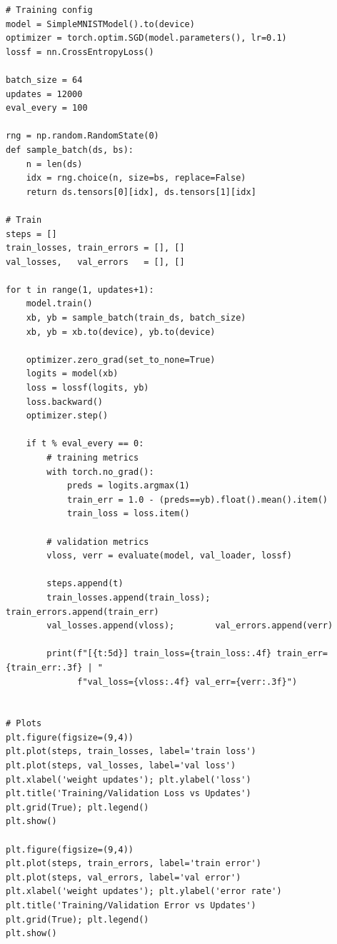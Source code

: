 \documentclass[11pt, reqno, letterpaper, twoside]{amsart}
\theoremstyle{plain}
\theoremstyle{definition}
\begin{document}
\begin{lstlisting}
# Training config
model = SimpleMNISTModel().to(device)
optimizer = torch.optim.SGD(model.parameters(), lr=0.1)
lossf = nn.CrossEntropyLoss()

batch_size = 64
updates = 12000             
eval_every = 100          

rng = np.random.RandomState(0)
def sample_batch(ds, bs):
    n = len(ds)
    idx = rng.choice(n, size=bs, replace=False)
    return ds.tensors[0][idx], ds.tensors[1][idx]

# Train
steps = []
train_losses, train_errors = [], []
val_losses,   val_errors   = [], []

for t in range(1, updates+1):
    model.train()
    xb, yb = sample_batch(train_ds, batch_size)
    xb, yb = xb.to(device), yb.to(device)

    optimizer.zero_grad(set_to_none=True)
    logits = model(xb)
    loss = lossf(logits, yb)
    loss.backward()
    optimizer.step()

    if t % eval_every == 0:
        # training metrics
        with torch.no_grad():
            preds = logits.argmax(1)
            train_err = 1.0 - (preds==yb).float().mean().item()
            train_loss = loss.item()

        # validation metrics
        vloss, verr = evaluate(model, val_loader, lossf)

        steps.append(t)
        train_losses.append(train_loss); train_errors.append(train_err)
        val_losses.append(vloss);        val_errors.append(verr)

        print(f"[{t:5d}] train_loss={train_loss:.4f} train_err={train_err:.3f} | "
              f"val_loss={vloss:.4f} val_err={verr:.3f}")


# Plots
plt.figure(figsize=(9,4))
plt.plot(steps, train_losses, label='train loss')
plt.plot(steps, val_losses, label='val loss')
plt.xlabel('weight updates'); plt.ylabel('loss')
plt.title('Training/Validation Loss vs Updates')
plt.grid(True); plt.legend()
plt.show()

plt.figure(figsize=(9,4))
plt.plot(steps, train_errors, label='train error')
plt.plot(steps, val_errors, label='val error')
plt.xlabel('weight updates'); plt.ylabel('error rate')
plt.title('Training/Validation Error vs Updates')
plt.grid(True); plt.legend()
plt.show()
\end{lstlisting}
\end{document}
